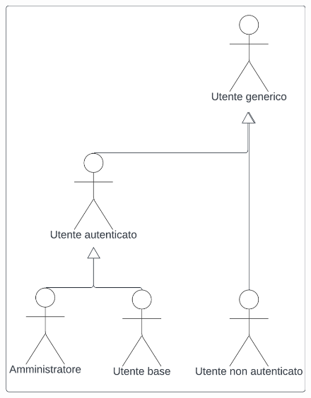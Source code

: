 \documentclass[12pt, oneside]{article}
\begin{document}
\begin{figure}[H]
\centering
\includegraphics[width=0.5\linewidth]{Attori_coinvolti.png}
\end{figure}
\newpage



%

%

%

\newpage




%

%

%














\end{document}
